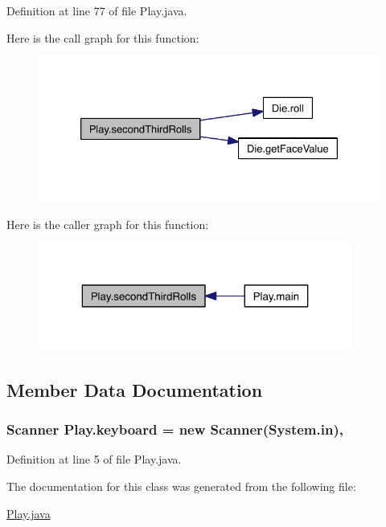 Definition at line 77 of file Play.\-java.



Here is the call graph for this function\-:\nopagebreak
\begin{figure}[H]
\begin{center}
\leavevmode
\includegraphics[width=328pt]{class_play_a9ea5cb7c71895dd961ddcedb880a0ca9_cgraph}
\end{center}
\end{figure}




Here is the caller graph for this function\-:\nopagebreak
\begin{figure}[H]
\begin{center}
\leavevmode
\includegraphics[width=292pt]{class_play_a9ea5cb7c71895dd961ddcedb880a0ca9_icgraph}
\end{center}
\end{figure}




\subsection{Member Data Documentation}
\hypertarget{class_play_abbb60c1b7f13afcb8a751deace00c438}{
\subsubsection[{keyboard}]{\setlength{\rightskip}{0pt plus 5cm}Scanner Play.\-keyboard = new Scanner(System.\-in)\hspace{0.3cm}{\ttfamily [static]}, {\ttfamily [package]}}}\label{class_play_abbb60c1b7f13afcb8a751deace00c438}


Definition at line 5 of file Play.\-java.



The documentation for this class was generated from the following file\-:\begin{DoxyCompactItemize}
\item 
\hyperlink{_play_8java}{Play.\-java}\end{DoxyCompactItemize}
